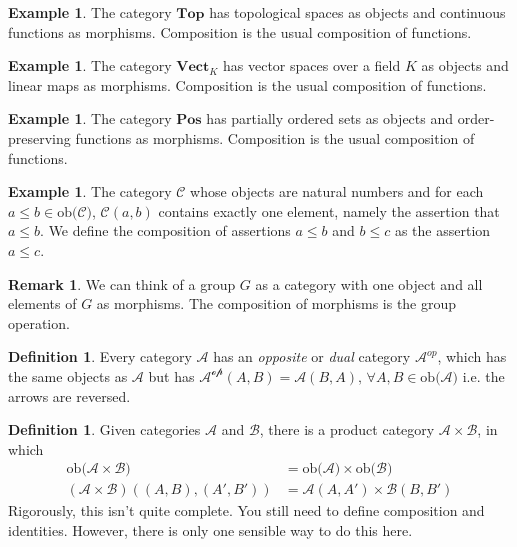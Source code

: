 \documentclass{article}
\theoremstyle{definition}
\newtheorem{definition}[theorem]{Definition}
\newtheorem{remark}[theorem]{Remark}
\newtheorem{example}[theorem]{Example}
\newcommand{\cat}[1]{\mathscr{#1}}
\newcommand{\catobj}[1]{\text{ob(}\cat{#1}\text{)}}
\newcommand{\catmor}[3]{\cat{#1}(#2, #3)}
\begin{document}
\begin{example}
    The category $\textbf{Top}$ has topological spaces as objects and continuous functions as morphisms. Composition is the usual composition of functions.
\end{example}

\begin{example}
    The category $\textbf{Vect}_K$ has vector spaces over a field $K$ as objects and linear maps as morphisms. Composition is the usual composition of functions.
\end{example}

\begin{example}
    The category $\textbf{Pos}$ has partially ordered sets as objects and order-preserving functions as morphisms. Composition is the usual composition of functions.
\end{example}

\begin{example}
    The category $\cat{C}$ whose objects are natural numbers and for each $a \leq b \in \catobj{C}$, $\catmor{C}{a}{b}$ contains exactly one element, namely the assertion that $a \leq b$. We define the composition of assertions $a \leq b$ and $b \leq c$ as the assertion $a \leq c$.
\end{example}

\begin{remark}
    We can think of a group $G$ as a category with one object and all elements of $G$ as morphisms. The composition of morphisms is the group operation.
\end{remark}

\begin{definition}
    Every category $\cat{A}$ has an \emph{opposite} or \emph{dual} category $\cat{A}^{op}$, which has the same objects as $\cat{A}$ but has $\catmor{A^{op}}{A}{B} = \catmor{A}{B}{A}, \, \forall A, B \in \catobj{A}$ i.e. the arrows are reversed.
\end{definition}

\begin{definition}
    Given categories $\cat{A}$ and $\cat{B}$, there is a product category $\cat{A} \times \cat{B}$, in which
    \begin{align*}
        \catobj{\cat{A} \times \cat{B}}            & = \catobj{A} \times \catobj{B}               \\
        (\cat{A} \times \cat{B})((A, B), (A', B')) & = \catmor{A}{A}{A'} \times \catmor{B}{B}{B'}
    \end{align*}
    Rigorously, this isn't quite complete. You still need to define composition and identities. However, there is only one
    sensible way to do this here.
\end{definition}
\end{document}
